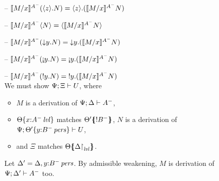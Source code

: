 \begin{itemize}
\smallskip

\item[--] $\rsubsta{M}{x}{(\tetap{z}{N})}{A^-} 
           = \tetap{z}{(\rsubsta{M}{x}{N}{A^-})}$
\item[--] $\rsubsta{M}{x}{\tetan{N}}{A^-} 
           = \tetan{\rsubsta{M}{x}{N}{A^-}}$

\item[--] $\rsubsta{M}{x}{(\tdownl{y}{N})}{A^-} 
           = \tdownl{y}{(\rsubsta{M}{x}{N}{A^-})}$

\item[--] $\rsubsta{M}{x}{(\tgnabl{y}{N})}{A^-} 
           = \tgnabl{y}{(\rsubsta{M}{x}{N}{A^-})}$ %

\item[--] $\rsubsta{M}{x}{(\tbangl{y}{N})}{A^-} 
           = \tbangl{y}{(\rsubsta{M}{x}{N}{A^-})}$\smallskip\\
  We must show $\foc{\Psi}{\Xi}{U}$, where
  \begin{itemize}
  \item $M$ is a derivation of $\foc{\Psi}{\Delta}{A^-}$, 
  \item $\tackon{\Theta}{x{:}\islvl{A^-}}$ matches 
     $\frameoff{\Theta'}{{!}B^-}$, $N$ is a derivation of 
     $\foc{\Psi}{\tackon{\Theta'}{y{:}\ispers{B^-}}}{U}$,
  \item and $\Xi$ matches $\frameoff{\Theta}{\restrictto{\Delta}{\mlvl}}$.
  \end{itemize}
 
  Let $\Delta' = \mkconj{\Delta}{y{:}\ispers{B^-}}$.
  By admissible weakening, $M$ is derivation of $\foc{\Psi}{\Delta'}{A^-}$ too.


\end{itemize}
